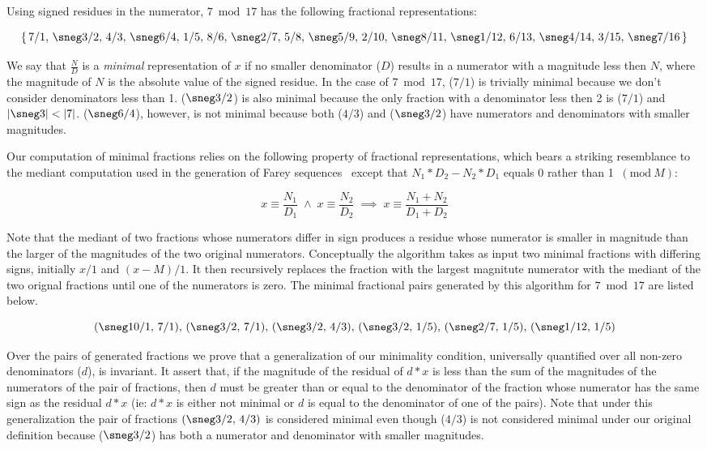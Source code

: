 \documentclass[submission,copyright,creativecommons]{eptcs}
\newcommand{\Mod}[1]{\ (\mathrm{mod}\ #1)}
\begin{document}
Using signed residues in the numerator, $7 \bmod 17$ has the
following fractional representations:

\[
\{
\,7/1,\,\sneg3/2,\,4/3,\,\sneg6/4,\,1/5,\,8/6,\,\sneg2/7,\,5/8,\,\sneg5/9,\,2/10,\,\sneg8/11,\,\sneg1/12,\,6/13,\,\sneg4/14,\,3/15,\,\sneg7/16\,
\}
\]

We say that $\frac{N}{D}$ is a \emph{minimal} representation of $x$ if
no smaller denominator ($D$) results in a numerator with a magnitude
less then $N$, where the magnitude of $N$ is the absolute value
of the signed residue.
In the case of $7 \bmod 17$, ($7/1$) is trivially minimal because we
don't consider denominators less than 1.  ($\sneg3/2$) is also minimal because
the only fraction with a denominator less then 2 is ($7/1$) and 
$\lvert \sneg3 \rvert < \lvert 7\rvert$. 
($\sneg6/4$), however, is not minimal because both ($4/3$)
and ($\sneg3/2$) have numerators and denominators with smaller magnitudes.

Our computation of minimal fractions relies on the following property
of fractional representations, which bears a striking resemblance to
the mediant computation used in the generation of Farey sequences~\cite{Farey}
except that $N_1*D_2 - N_2*D_1$ equals 0 rather than 1 $\Mod{M}$:

\begin{equation*}
x \equiv \frac{N_1}{D_1} \; \land \;
x \equiv \frac{N_2}{D_2} \; \implies \;
x \equiv \frac{N_1 + N_2}{D_1 + D_2}
\end{equation*}

Note that the mediant of two fractions whose numerators differ in sign
produces a residue whose numerator is smaller in magnitude than the
larger of the magnitudes of the two original numerators.  Conceptually
the algorithm takes as input two minimal fractions with differing
signs, initially $x/1$ and $(x-M)/1$.  It then recursively replaces
the fraction with the largest magnitute numerator with the mediant of
the two orignal fractions until one of the numerators is zero.  The
minimal fractional pairs generated by this algorithm for $7 \bmod 17$
are listed below.

\[
(\sneg10/1,\,7/1),\,(\sneg3/2,\,7/1),\,(\sneg3/2,\,4/3),\,(\sneg3/2,\,1/5),\,(\sneg2/7,\,1/5),\,(\sneg1/12,\,1/5)
\]

Over the pairs of generated fractions we prove that a generalization
of our minimality condition, universally quantified over all non-zero
denominators ($d$), is invariant.  It assert that, if the magnitude of
the residual of $d*x$ is less than the sum of the magnitudes of the
numerators of the pair of fractions, then $d$ must be greater than or
equal to the denominator of the fraction whose numerator has the same
sign as the residual $d*x$ (ie: $d*x$ is either not minimal or $d$ is
equal to the denominator of one of the pairs).  Note that under this
generalization the pair of fractions $(\sneg3/2,\,4/3)$ is considered
minimal even though ($4/3$) is not considered minimal under our original
definition because ($\sneg3/2$) has both a numerator and denominator
with smaller magnitudes.
\end{document}
